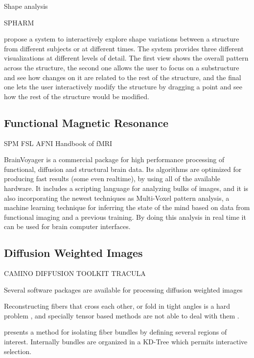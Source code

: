Shape analysis

SPHARM

\autocite{hermann_visual_2014} propose a system to interactively explore shape variations between a structure from different subjects or at different times. The system provides three different visualizations at different levels of detail. The first view shows the overall pattern across the structure, the second one allows the user to focus on a substructure and see how changes on it are related to the rest of the structure, and the final one lets the user interactively modify the structure by dragging a  point and see how the rest of the structure would be modified. 

\subsection{Functional Magnetic Resonance}

SPM
FSL
AFNI
Handbook of fMRI

BrainVoyager \autocite{goebel_brainvoyagerpast_2012} is a commercial package for high performance processing of functional, diffusion and structural brain data. Its algorithms are optimized for producing fast results (some even realtime), by using all of the available hardware. It includes a scripting language for analyzing bulks of images, and it is also incorporating the newest techniques as Multi-Voxel pattern analysis, a machine learning technique for inferring the state of the mind based on data from functional imaging and a previous training. By doing this analysis in real time it can be used for brain computer interfaces. 

\subsection{Diffusion Weighted Images}

CAMINO
DIFFUSION TOOLKIT
TRACULA



Several software packages are available for processing diffusion weighted images \autocite{hasan_review_2011}

Reconstructing fibers that cross each other, or fold in tight angles is a hard problem \autocite{fillard_quantitative_2011}, and specially tensor based methods are not able to deal with them \autocite{tournier_diffusion_2011}.


\autocite{blaas_fast_2005} presents a method for isolating fiber bundles by defining several regions of interest. Internally bundles are organized in a KD-Tree which permits interactive selection.

